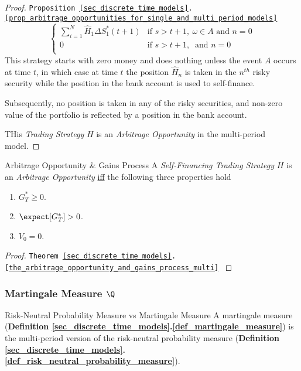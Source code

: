 \documentclass[11pt,a4paper]{article}
\begin{document}
\begin{proof}{\texttt{Proposition \ref{sec_discrete_time_models}.\ref{prop_arbitrage_opportunities_for_single_and_multi_period_models}}}
\[\begin{cases}
      \sum_{i=1}^N\hat{H}_1\Delta S_1^*(t+1)&\text{if }s>t+1,\ \omega\in A\text{ and }n=0\\
      0&\text{if }s>t+1,\ \text{ and }n=0\\
    \end{cases} \]
    This strategy starts with zero money and does nothing unless the event $A$ occurs at time $t$, in which case at time $t$ the position $\hat{H}_n$ is taken in the $n^{th}$ risky security while the position in the bank account is used to self-finance.
    \par Subsequently, no position is taken in any of the risky securities, and non-zero value of the portfolio is reflected by a position in the bank account.
    \par THis \textit{Trading Strategy} $H$ is an \textit{Arbitrage Opportunity} in the multi-period model.\proved
  \end{proof}

  \begin{theorem}{Arbitrage Opportunity \& Gains Process}\label{the_arbitrage_opportunity_and_gains_process_multi}
    A \textit{Self-Financing Trading Strategy} $H$ is an \textit{Arbitrage Opportunity} \underline{iff} the following three properties hold
    \begin{enumerate}
      \item $G_T^*\geq0$.
      \item $\expect[G_T^*]>0$.
      \item $V_0=0$.
    \end{enumerate}
  \end{theorem}

  \begin{proof}{\texttt{Theorem \ref{sec_discrete_time_models}.\ref{the_arbitrage_opportunity_and_gains_process_multi}} }

  \end{proof}

\subsubsection{Martingale Measure $\Q$}

  \begin{remark}{Risk-Neutral Probability Measure vs Martingale Measure}
    A martingale measure (\textbf{Definition \ref{sec_discrete_time_models}.\ref{def_martingale_measure}}) is the multi-period version of the risk-neutral probability measure (\textbf{Definition \ref{sec_discrete_time_models}.\ref{def_risk_neutral_probability_measure}}).
  \end{remark}
\end{document}
